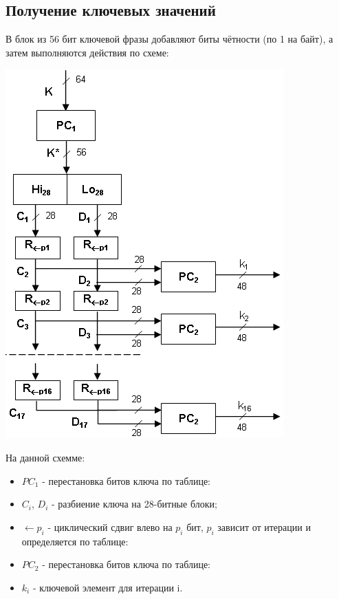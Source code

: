 \subsection{Получение ключевых значений}
В блок из 56 бит ключевой фразы добавляют биты чётности (по 1 на байт), а затем выполняются действия по схеме:\\
\begin{center}
\includegraphics[scale=0.5]{des_key}
\end{center}
На данной схемме:
\begin{itemize}
\item $PC_1$ \-- перестановка битов ключа по таблице:
\item $C_i$, $D_i$ \-- разбиение ключа на 28-битные блоки;
\item $\leftarrow p_i$ \-- циклический сдвиг влево на $p_i$ бит, $p_i$ зависит от итерации и определяется по таблице:
\item $PC_2$ \-- перестановка битов ключа по таблице:
\item $k_i$ \-- ключевой элемент для итерации i.
\end{itemize}